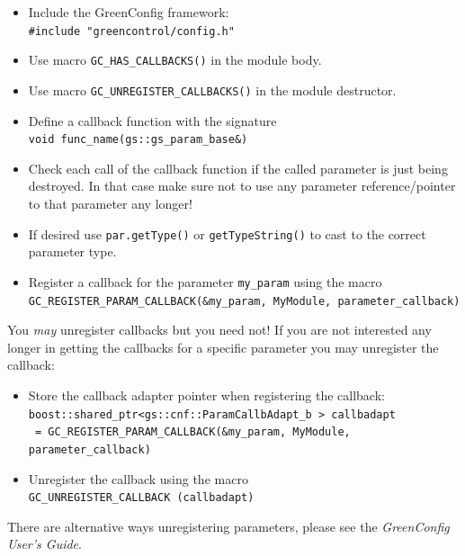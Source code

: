 \begin{itemize}
  \item Include the GreenConfig framework: \\
           \lstinline|#include "greencontrol/config.h"|
  \item Use macro \lstinline|GC_HAS_CALLBACKS()| in the module body.
  \item Use macro \lstinline|GC_UNREGISTER_CALLBACKS()| in the module destructor.
  \item Define a callback function with the signature \\
            \lstinline|void func_name(gs::gs_param_base&)|
  \item Check each call of the callback function if the called parameter is just being destroyed. In that case make sure not to use any parameter reference/pointer to that parameter any longer!
  \item If desired use \lstinline|par.getType()| or \lstinline|getTypeString()| to cast to the correct parameter type.
\end{itemize}


\begin{itemize}
  \item Register a callback for the parameter \lstinline|my_param| using the macro \\
          \lstinline|GC_REGISTER_PARAM_CALLBACK(&my_param, MyModule, parameter_callback)|
\end{itemize}


You {\em may} unregister callbacks but you need not! If you are not interested any longer in getting the callbacks for a specific parameter you may unregister the callback:
\begin{itemize}
  \item Store the callback adapter pointer when registering the callback: \\
          \lstinline|boost::shared_ptr<gs::cnf::ParamCallbAdapt_b > callbadapt| \\
          \lstinline| = GC_REGISTER_PARAM_CALLBACK(&my_param, MyModule, parameter_callback)|
  \item Unregister the callback using the macro \\
          \lstinline|GC_UNREGISTER_CALLBACK (callbadapt)| 
\end{itemize}
There are alternative ways unregistering parameters, please see the {\em GreenConfig User's Guide}.

